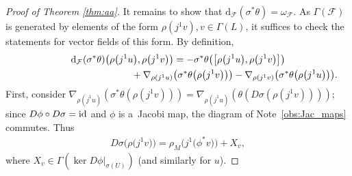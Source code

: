 \documentclass[10pt,a4paper]{amsart}
\numberwithin{equation}{section}
\newcommand{\de}{\mathrm{d}} %
\begin{document}
\begin{proof}[Proof of Theorem \ref{thm:aa}]
It remains to show that $\de_\mathcal{F}(\sigma^*\theta)=\omega_{\mathcal{F}}$. As $\Gamma(\mathcal{F})$ is generated by elements of the form $\rho(j^1v),v\in\Gamma(L)$, it suf\/f\/ices to check the statements for vector f\/ields of this form. By def\/inition,
\begin{gather}
 \de_{\mathcal{F}}(\sigma^*\theta)\big(\rho\big(j^1u\big),\rho\big(j^1v\big)\big)
 = -\sigma^*\theta\big(\big[\rho\big(j^1u\big), \rho\big(j^1v\big)\big]\big)\nonumber\\
 \hphantom{\de_{\mathcal{F}}(\sigma^*\theta)\big(\rho\big(j^1u\big),\rho\big(j^1v\big)\big)=}{} +
 {\nabla}_{\rho(j^1u)}\big(\sigma^*\theta\big(\rho\big(j^1v\big)\big)\big) - {\nabla}_{\rho(j^1v)}\big(\sigma^*\theta\big(\rho\big(j^1u\big)\big)\big). \label{eq:30}
\end{gather}
First, consider $ {\nabla}_{\rho(j^1u)}(\sigma^*\theta(\rho(j^1v))) ={\nabla}_{\rho(j^1u)}(\theta(D\sigma(\rho(j^1v))))$; since $D\phi \circ D\sigma = {\rm id}$ and $\phi$ is a~Jacobi map, the diagram of Note~\ref{obs:Jac_maps} commutes. Thus
\begin{gather*}
 D\sigma\big(\rho\big(j^1v\big)\big) = \rho_M\big(j^1\big(\phi^*v\big)\big) + X_v,
\end{gather*}
where $X_v \in \Gamma(\ker D\phi|_{\sigma(U)})$ (and similarly for $u$).


\end{proof}
\end{document}
